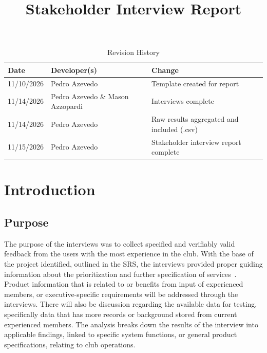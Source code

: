 \documentclass{article}
\title{Stakeholder Interview Report\\\progname}
\author{\authname}
\date{}
\begin{document}
\maketitle

\begin{table}[hp]
\caption{Revision History} \label{TblRevisionHistory}
\begin{tabularx}{\textwidth}{llX}
\toprule
\textbf{Date} & \textbf{Developer(s)} & \textbf{Change}\\
\midrule
11/10/2026 & Pedro Azevedo & Template created for report \\
11/14/2026 & Pedro Azevedo \& Mason Azzopardi & Interviews complete \\
11/14/2026 & Pedro Azevedo & Raw results aggregated and included (.csv) \\
11/15/2026 & Pedro Azevedo & Stakeholder interview report complete \\
\bottomrule
\end{tabularx}
\end{table}

\newpage
\tableofcontents
\listoftables
\newpage

\section{Introduction}
\label{sec:intro}

\subsection{Purpose}

The purpose of the interviews was to collect specified and verifiably valid feedback from the 
users with the most experience in the club. With the base of the project identified, outlined 
in the SRS, the interviews provided proper guiding information about the prioritization and 
further specification of services~\citep{TroitskySRS}. Product information 
that is related to or benefits from input of experienced members, or executive-specific 
requirements will be addressed through the interviews. There will also be discussion 
regarding the available data for testing, specifically data that has more records or 
background stored from current experienced members. The analysis breaks down the results 
of the interview into applicable findings, linked to specific system functions, or general 
product specifications, relating to club operations.
\end{document}
